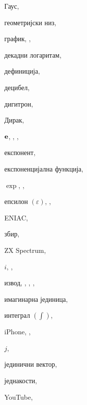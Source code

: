 \begin{theindex}
  \indexspace

  \item Гаус, 
  \item геометријски низ, 
  \item график, , 

  \indexspace

  \item декадни логаритам, 
  \item дефиниција, 
  \item децибел, 
  \item дигитрон, 
  \item Дирак, 

  \indexspace

  \item ${\bf e}$, , , 
  \item експонент, 
  \item експоненцијална функција, 
  \item $\exp$, , 
  \item епсилон $(\varepsilon)$, , 
  \interskip
  \item ENIAC, 

  \indexspace

  \item збир, 
  \interskip
  \item \textsf{ZX Spectrum}, 

  \indexspace

  \item $i$, , 
  \item извод, , , , 
  \item имагинарна јединица, 
  \item интеграл $(\int)$, 
  \interskip
  \item iPhone, , 

  \indexspace

  \item $j$, 
  \item јединични вектор, 
  \item једнакости, 
  \interskip
  \item {\sf  YouTube}, 


\end{theindex}
